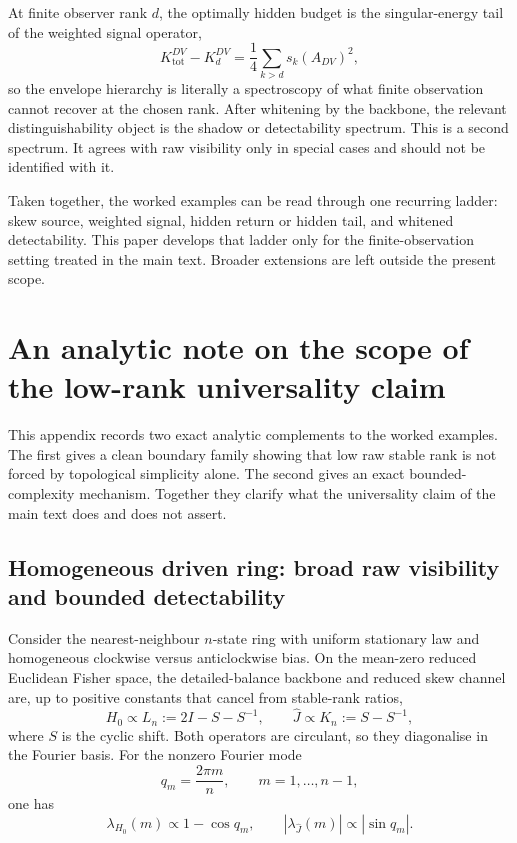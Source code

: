 \documentclass[11pt,a4paper]{article}
\numberwithin{equation}{section}
\theoremstyle{thmcompact}
\theoremstyle{remark}
\begin{document}
At finite observer rank \(d\), the optimally hidden budget is the singular-energy tail of the weighted signal operator,
\begin{equation}
K_{\mathrm{tot}}^{DV}-K_d^{DV}
=
\frac14\sum_{k>d}s_k(A_{DV})^2,
\end{equation}
so the envelope hierarchy is literally a spectroscopy of what finite observation cannot recover at the chosen rank. After whitening by the backbone, the relevant distinguishability object is the shadow or detectability spectrum. This is a second spectrum. It agrees with raw visibility only in special cases and should not be identified with it.

Taken together, the worked examples can be read through one recurring ladder: skew source, weighted signal, hidden return or hidden tail, and whitened detectability. This paper develops that ladder only for the finite-observation setting treated in the main text. Broader extensions are left outside the present scope.


\section{An analytic note on the scope of the low-rank universality claim}
\label{app:universality_boundary_note}

This appendix records two exact analytic complements to the worked examples. The first gives a clean boundary family showing that low raw stable rank is not forced by topological simplicity alone. The second gives an exact bounded-complexity mechanism. Together they clarify what the universality claim of the main text does and does not assert.

\subsection{Homogeneous driven ring: broad raw visibility and bounded detectability}

Consider the nearest-neighbour \(n\)-state ring with uniform stationary law and homogeneous clockwise versus anticlockwise bias. On the mean-zero reduced Euclidean Fisher space, the detailed-balance backbone and reduced skew channel are, up to positive constants that cancel from stable-rank ratios,
\begin{equation}
H_0 \propto L_n:=2I-S-S^{-1},
\qquad
\widehat J \propto K_n:=S-S^{-1},
\end{equation}
where \(S\) is the cyclic shift. Both operators are circulant, so they diagonalise in the Fourier basis. For the nonzero Fourier mode
\begin{equation}
q_m=\frac{2\pi m}{n},
\qquad
m=1,\dots,n-1,
\end{equation}
one has
\begin{equation}
\lambda_{H_0}(m)\propto 1-\cos q_m,
\qquad
|\lambda_{\widehat J}(m)|\propto |\sin q_m|.
\end{equation}
\end{document}

